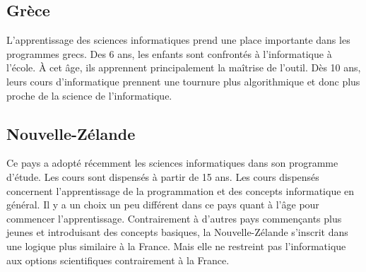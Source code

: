 \subsection{Grèce}
L'apprentissage des sciences informatiques prend une place importante dans les programmes grecs. Des 6 ans, les enfants sont confrontés à l'informatique à l'école. À cet âge, ils apprennent principalement la maîtrise de l'outil. Dès 10 ans, leurs cours d'informatique prennent une tournure plus algorithmique et donc plus proche de la science de l'informatique.

\subsection{Nouvelle-Zélande}
Ce pays a adopté récemment les sciences informatiques dans son programme d'étude. Les cours sont dispensés à partir de 15 ans. Les cours dispensés concernent l'apprentissage de la programmation et des concepts informatique en général. Il y a un choix un peu différent dans ce pays quant à l'âge pour commencer l'apprentissage. Contrairement à d'autres pays commençants plus jeunes et introduisant des concepts basiques, la Nouvelle-Zélande s'inscrit dans une logique plus similaire à la France. Mais elle ne restreint pas l'informatique aux options scientifiques contrairement à la France.
